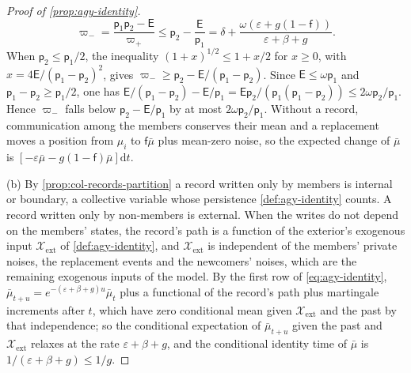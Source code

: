 \begin{proof}[Proof of \cref{prop:agy-identity}]
\begin{equation*}
\varpi_-=\frac{\mathsf p_1\mathsf p_2-\mathsf E}{\varpi_+}\le\mathsf p_2-\frac{\mathsf E}{\mathsf p_1}=\delta+\frac{\omega(\varepsilon+g(1-\mathsf f))}{\varepsilon+\beta+g}.
\end{equation*}
When $\mathsf p_2\le\mathsf p_1/2$, the inequality $(1+x)^{1/2}\le1+x/2$ for $x\ge0$, with $x=4\mathsf E/(\mathsf p_1-\mathsf p_2)^2$, gives $\varpi_-\ge\mathsf p_2-\mathsf E/(\mathsf p_1-\mathsf p_2)$. Since $\mathsf E\le\omega\mathsf p_1$ and $\mathsf p_1-\mathsf p_2\ge\mathsf p_1/2$, one has $\mathsf E/(\mathsf p_1-\mathsf p_2)-\mathsf E/\mathsf p_1=\mathsf E\mathsf p_2/(\mathsf p_1(\mathsf p_1-\mathsf p_2))\le2\omega\mathsf p_2/\mathsf p_1$. Hence $\varpi_-$ falls below $\mathsf p_2-\mathsf E/\mathsf p_1$ by at most $2\omega\mathsf p_2/\mathsf p_1$. Without a record, communication among the members conserves their mean and a replacement moves a position from $\mu_i$ to $\mathsf f\bar\mu$ plus mean-zero noise, so the expected change of $\bar\mu$ is $[-\varepsilon\bar\mu-g(1-\mathsf f)\bar\mu]\mathrm dt$.

(b) By \cref{prop:col-records-partition} a record written only by members is internal or boundary, a collective variable whose persistence \cref{def:agy-identity} counts. A record written only by non-members is external. When the writes do not depend on the members' states, the record's path is a function of the exterior's exogenous input $\mathcal X_{\mathrm{ext}}$ of \cref{def:agy-identity}, and $\mathcal X_{\mathrm{ext}}$ is independent of the members' private noises, the replacement events and the newcomers' noises, which are the remaining exogenous inputs of the model. By the first row of \eqref{eq:agy-identity}, $\bar\mu_{t+u}=e^{-(\varepsilon+\beta+g)u}\bar\mu_t$ plus a functional of the record's path plus martingale increments after $t$, which have zero conditional mean given $\mathcal X_{\mathrm{ext}}$ and the past by that independence; so the conditional expectation of $\bar\mu_{t+u}$ given the past and $\mathcal X_{\mathrm{ext}}$ relaxes at the rate $\varepsilon+\beta+g$, and the conditional identity time of $\bar\mu$ is $1/(\varepsilon+\beta+g)\le1/g$.
\end{proof}

